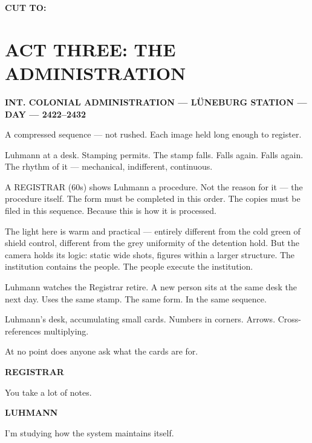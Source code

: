 \documentclass[12pt]{article}
\newcommand{\sceneheading}[1]{%
  \vspace{10pt}%
  \noindent\textbf{#1}%
  \vspace{6pt}%
}
\newcommand{\trans}[1]{%
  \vspace{8pt}%
  \begin{flushright}\textbf{#1}\end{flushright}%
  \vspace{4pt}%
}
\newcommand{\character}[1]{%
  \vspace{8pt}%
  \begin{center}\textbf{#1}\end{center}%
  \vspace{-4pt}%
}
\newenvironment{dialogue}{%
  \begin{center}%
  \begin{minipage}{0.62\textwidth}%
}{%
  \end{minipage}%
  \end{center}%
  \vspace{4pt}%
}
\newenvironment{action}{%
  \vspace{4pt}%
  \noindent\ignorespaces%
}{%
  \vspace{6pt}%
}
\begin{document}
\trans{CUT TO:}


\section*{ACT THREE: THE ADMINISTRATION}

\sceneheading{INT. COLONIAL ADMINISTRATION — LÜNEBURG STATION — DAY — 2422–2432}

\begin{action}
A compressed sequence — not rushed. Each image held long enough to register.

\medskip

Luhmann at a desk. Stamping permits. The stamp falls. Falls again. Falls again. The rhythm of it — mechanical, indifferent, continuous.

\medskip

A REGISTRAR (60s) shows Luhmann a procedure. Not the reason for it — the procedure itself. The form must be completed in this order. The copies must be filed in this sequence. Because this is how it is processed.

\medskip

The light here is warm and practical — entirely different from the cold green of shield control, different from the grey uniformity of the detention hold. But the camera holds its logic: static wide shots, figures within a larger structure. The institution contains the people. The people execute the institution.

\medskip

Luhmann watches the Registrar retire. A new person sits at the same desk the next day. Uses the same stamp. The same form. In the same sequence.

\medskip

Luhmann's desk, accumulating small cards. Numbers in corners. Arrows. Cross-references multiplying.

At no point does anyone ask what the cards are for.
\end{action}

\character{REGISTRAR}
\begin{dialogue}
You take a lot of notes.
\end{dialogue}

\character{LUHMANN}
\begin{dialogue}
I'm studying how the system maintains itself.
\end{dialogue}
\end{document}
